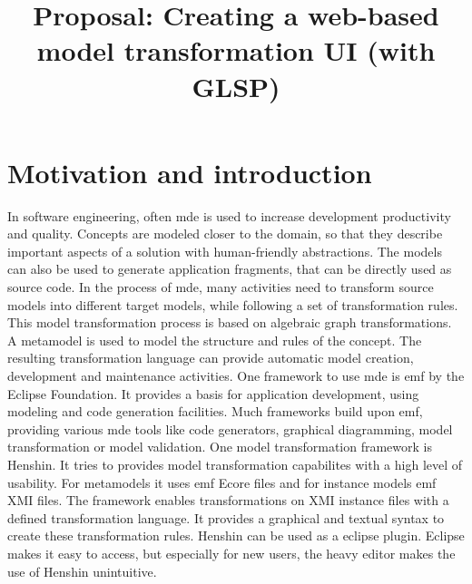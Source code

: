 \documentclass[conference,onecolumn]{IEEEtran}
\begin{document}
  \title{Proposal: Creating a web-based model transformation UI (with GLSP)}

  \author{
    }

  \maketitle

  \IEEEpeerreviewmaketitle

  \tableofcontents
  \newpage

  \section{Motivation and introduction}
  \label{sec:motivation}

  In software engineering, often \ac{mde} is used to increase development productivity and quality. Concepts are modeled closer to the domain, so that they describe important aspects of a solution with human-friendly abstractions. The models can also be used to generate application fragments, that can be directly used as source code. In the process of \ac{mde}, many activities need to transform source models into different target models, while following a set of transformation rules. This model transformation process is based on algebraic graph transformations. A metamodel is used to model the structure and rules of the concept. The resulting transformation language can provide automatic model creation, development and maintenance activities. \cite{transformations-modeldriven} One framework to use \ac{mde} is \ac{emf} by the Eclipse Foundation. It provides a basis for application development, using modeling and code generation facilities. Much frameworks build upon \ac{emf}, providing various \ac{mde} tools like code generators, graphical diagramming, model transformation or model validation. \cite{emf} One model transformation framework is Henshin. \cite{henshin-repo} It tries to provides model transformation capabilites with a high level of usability. \cite{henshin-usability} For metamodels it uses \ac{emf} Ecore files and for instance models \ac{emf} XMI files. The framework enables transformations on XMI instance files with a defined transformation language. It provides a graphical and textual syntax to create these transformation rules. \cite{henshin-repo} Henshin can be used as a eclipse plugin. Eclipse makes it easy to access, but especially for new users, the heavy editor makes the use of Henshin unintuitive.
\end{document}
